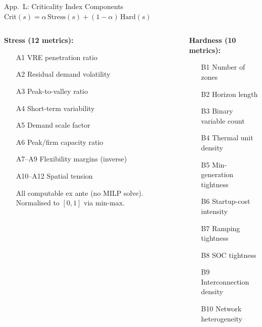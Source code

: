 \documentclass[aspectratio=169, 10pt]{beamer}
\newcommand{\backlink}[2]{\vfill\hfill\hyperlink{#1}{\beamerreturnbutton{\tiny #2}}}
\begin{document}
\begin{frame}{App.\ L: Criticality Index Components}
\hypertarget{app:L}{}
$\mathrm{Crit}(s) = \alpha\,\mathrm{Stress}(s) + (1-\alpha)\,\mathrm{Hard}(s)$
\vspace{0.3em}

\begin{columns}[T]
\begin{column}{0.48\textwidth}
\textbf{Stress (12 metrics):}
\begin{enumerate}
  \item[A1] VRE penetration ratio
  \item[A2] Residual demand volatility
  \item[A3] Peak-to-valley ratio
  \item[A4] Short-term variability
  \item[A5] Demand scale factor
  \item[A6] Peak/firm capacity ratio
  \item[A7--A9] Flexibility margins (inverse)
  \item[A10--A12] Spatial tension
  \vspace{0.5em}
  \item[] {\scriptsize All computable ex ante (no MILP solve). Normalised to $[0,1]$ via min-max.}
\end{enumerate}
\end{column}
\begin{column}{0.48\textwidth}
\textbf{Hardness (10 metrics):}
\begin{enumerate}
  \item[B1] Number of zones
  \item[B2] Horizon length
  \item[B3] Binary variable count
  \item[B4] Thermal unit density
  \item[B5] Min-generation tightness
  \item[B6] Startup-cost intensity
  \item[B7] Ramping tightness
  \item[B8] SOC tightness
  \item[B9] Interconnection density
  \item[B10] Network heterogeneity
  \item[] \backlink{main:scengen}{Block 1: Scenarios}
\end{enumerate}
\end{column}
\end{columns}
\end{frame}
\end{document}

